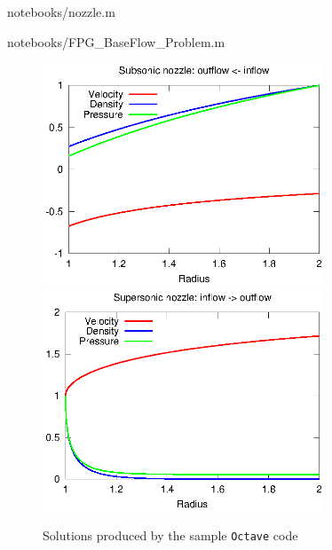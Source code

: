 \documentclass[letterpaper,11pt,nointlimits,reqno]{amsart}
\begin{document}

                {notebooks/nozzle.m}


                {notebooks/FPG_BaseFlow_Problem.m}

\begin{figure}
  \centering
  \includegraphics[width=0.75\textwidth]{nozzle_subsonic}
  \\
  \includegraphics[width=0.75\textwidth]{nozzle_supersonic}
  \caption{
      \label{fig:sample_solns}
      Solutions produced by the sample \texttt{Octave} code
  }
\end{figure}
\end{document}
